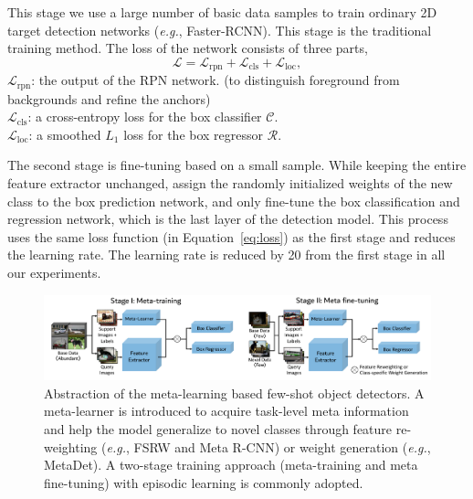  This stage we use a large number of basic data samples to train ordinary 2D target detection networks (\textit{e.g.}, Faster-RCNN). This stage is the traditional training method. The loss of the network consists of three parts, 
\begin{equation}
    \mathcal{L} = \mathcal{L}_{\text{rpn}} + \mathcal{L}_{\text{cls}} + \mathcal{L}_{\text{loc}},
    \label{eq:loss}
\end{equation}
$\mathcal{L}_\text{rpn}$: the output of the RPN network. (to distinguish foreground from backgrounds and refine the
anchors)\\
$\mathcal{L}_\text{cls}$: a cross-entropy loss for the box classifier $\mathcal{C}$.\\
$\mathcal{L}_\text{loc}$: a smoothed $L_1$ loss for the box regressor $\mathcal{R}$.

 The second stage is fine-tuning based on a small sample. While keeping the entire feature extractor unchanged, assign the randomly initialized weights of the new class to the box prediction network, and only fine-tune the box classification and regression network, which is the last layer of the detection model. This process uses the same loss function (in Equation~\ref{eq:loss}) as the first stage and reduces the learning rate. The learning rate is reduced by 20 from the first stage in all our experiments. 

\begin{figure}[ht]
    \centering
    \includegraphics[width=\linewidth]{figs/TFA_fig2.pdf}
    \vspace{-8mm}
    \caption{Abstraction of the meta-learning based few-shot object detectors. A meta-learner is introduced to acquire task-level meta information and help the model generalize to novel classes through feature re-weighting (\textit{e.g.}, FSRW and Meta R-CNN) or weight generation (\textit{e.g.}, MetaDet). A two-stage training approach (meta-training and meta fine-tuning) with episodic learning is commonly adopted.}
    \label{fig:meta_arch}
\end{figure}

